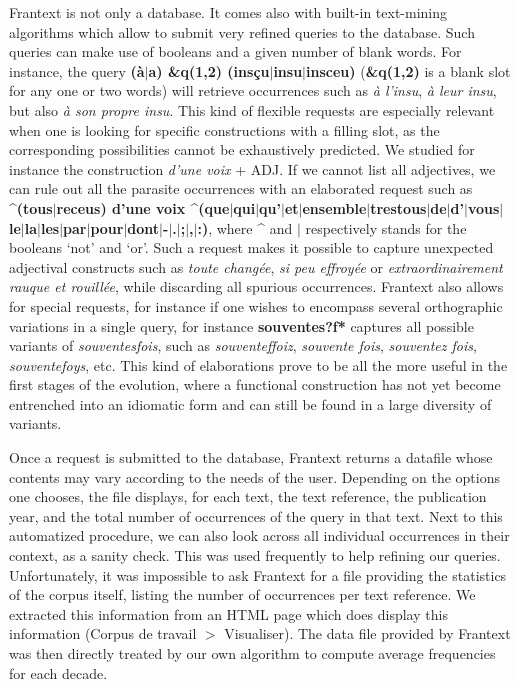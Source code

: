 \documentclass[12pt,twocolumn,amsmath,amssymb,aps,longbibliography]{revtex4-1}  %
\newcommand{\tit}{\textit}
\begin{document}
Frantext is not only a database. It comes also with built-in text-mining algorithms which allow to submit very refined queries to the database. Such queries can make use of booleans and a given number of blank words. For instance, the query \textbf{(\`a$|$a) \&q(1,2) (ins\c{c}u$|$insu$|$insceu)} (\textbf{\&q(1,2)} is a blank slot for any one or two words) will retrieve occurrences such as \textit{\`a l'insu}, \textit{\`a leur insu}, but also \textit{\`a son propre insu}. This kind of flexible requests are especially relevant when one is looking for specific constructions with a filling slot, as the corresponding possibilities cannot be exhaustively predicted. We studied for instance the construction \textit{d'une voix} + ADJ. If we cannot list all adjectives, we can rule out all the parasite occurrences with an elaborated request such as \textbf{\^{}(tous$|$receus) d'une voix \^{}(que$|$qui$|$qu'$|$et$|$ensemble$|$trestous$|$de$|$d'$|$vous$|$le$ |$la$|  $les$|$par$|$pour$|$dont$|$-$|$.$|$;$|$,$|$:)}, where \textbf{\^{}} and $\mathbf{|}$ respectively stands for the booleans `not' and `or'. Such a request makes it possible to capture unexpected adjectival constructs such as \tit{toute chang\'ee}, \tit{si peu effroy\'ee} or \tit{extraordinairement rauque et rouill\'ee}, while discarding all spurious occurrences. Frantext also allows for special requests, for instance if one wishes to encompass several orthographic variations in a single query, for instance \textbf{souventes?f*} captures all possible variants of  \textit{souventesfois}, such as \textit{souventeffoiz}, \textit{souvente fois}, \tit{souventez fois}, \tit{souventefoys}, etc. This kind of elaborations prove to be all the more useful in the first stages of the evolution, where a functional construction has not yet become entrenched into an idiomatic form and can still be found in a large diversity of variants. 

Once a request is submitted to the database, Frantext returns a datafile whose contents may vary according to the needs of the user. Depending on the options one chooses, the file displays, for each text, the text reference, the publication year, and the total number of occurrences of the query in that text. Next to this automatized procedure, we can also look across all individual occurrences in their context, as a sanity check. This was used frequently to help refining our queries. Unfortunately, it was impossible to ask Frantext for a file providing the statistics of the corpus itself, listing the number of occurrences per text reference. We extracted this information from an HTML page which does display this information (Corpus de travail $>$ Visualiser). The data file provided by Frantext was then directly treated by our own algorithm to compute average frequencies for each decade. 
\end{document}
